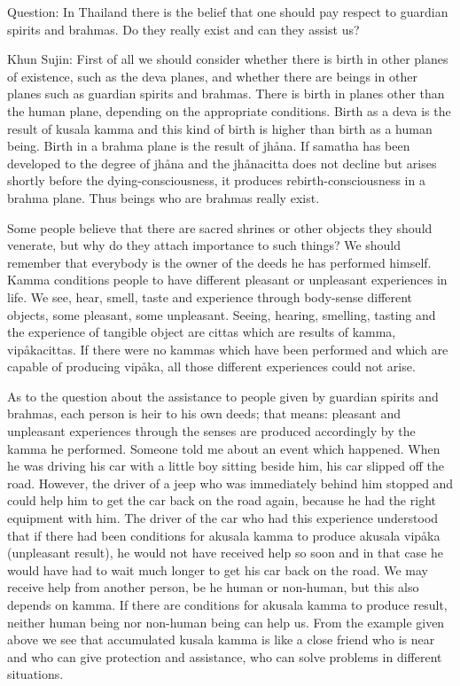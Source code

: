 \documentclass[12pt,twoside]{article}
\begin{document}
Question: In Thailand there is the belief that one should pay respect to
guardian spirits and brahmas. Do they really exist and can they assist
us?

Khun Sujin: First of all we should consider whether there is birth in
other planes of existence, such as the deva planes, and whether there
are beings in other planes such as guardian spirits and brahmas. There
is birth in planes other than the human plane, depending on the
appropriate conditions. Birth as a deva is the result of kusala kamma
and this kind of birth is higher than birth as a human being. Birth in
a brahma plane is the result of jh{\aa}na. If samatha has been
developed to the degree of jh{\aa}na and the jh{\aa}nacitta does not
decline but arises shortly before the dying{}-consciousness, it
produces rebirth{}-consciousness in a brahma plane. Thus beings who are
brahmas really exist. 

Some people believe that there are sacred shrines or other objects they
should venerate, but why do they attach importance to such things? We
should remember that everybody is the owner of the deeds he has
performed himself. Kamma conditions people to have different pleasant
or unpleasant experiences in life. We see, hear, smell, taste and
experience through body{}-sense different objects, some pleasant, some
unpleasant. Seeing, hearing, smelling, tasting and the experience of
tangible object are cittas which are results of kamma,
vip{\aa}kacittas. If there were no kammas which have been performed and
which are capable of producing vip{\aa}ka, all those different
experiences could not arise. 

As to the question about the assistance to people given by guardian
spirits and brahmas, each person is
{\textasciigrave}{\textasciigrave}heir{\textquotesingle}{\textquotesingle}
to his own deeds; that means: pleasant and unpleasant experiences
through the senses are produced accordingly by the kamma he performed.
Someone told me about an event which happened. When he was driving his
car with a little boy sitting beside him, his car slipped off the road.
However, the driver of a jeep who was immediately behind him stopped
and could help him to get the car back on the road again, because he
had the right equipment with him. The driver of the car who had this
experience understood that if there had been conditions for akusala
kamma to produce akusala vip{\aa}ka (unpleasant result), he would not
have received help so soon and in that case he would have had to wait
much longer to get his car back on the road. We may receive help from
another person, be he human or non{}-human, but this also depends on
kamma. If there are conditions for akusala kamma to produce result,
neither human being nor non{}-human being can help us. From the example
given above we see that accumulated kusala kamma is like a close friend
who is near and who can give protection and assistance, who can solve
problems in different situations. 
\end{document}
